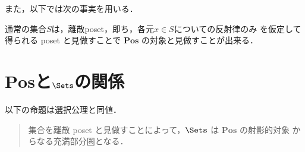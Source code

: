 \documentclass[a4j]{ltjsarticle}
\newcommand{\Pos}{\mathbf{Pos}}
\begin{document}
また，以下では次の事実を用いる．
\begin{fact}
 通常の集合$S$は，離散poset，即ち，各元$x \in S$についての反射律のみ
 を仮定して得られる poset と見做すことで $\Pos$ の対象と見做すことが出来る．
\end{fact}

\section{$\Pos$と$\Sets$の関係}
\begin{theorem}
 以下の命題は選択公理と同値．
 \begin{quotation}
  集合を離散 poset と見做すことによって，$\Sets$ は $\Pos$ の射影的対象
  からなる充満部分圏となる．
 \end{quotation}
\end{theorem}
\end{document}
